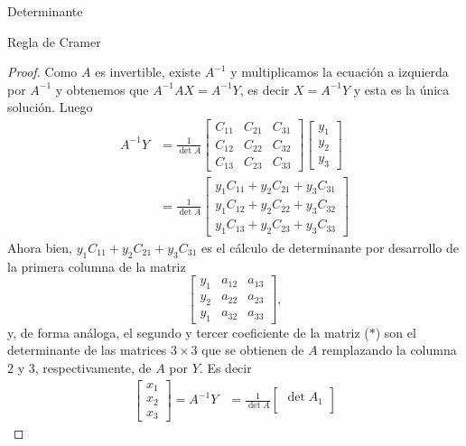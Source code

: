 \begin{chapter}{Determinante}
\begin{section}{Regla de Cramer}
\begin{proof}
                     Como $A$  es invertible, existe $A^{-1}$ y multiplicamos la ecuación a izquierda por $A^{-1}$ y obtenemos que $A^{-1}A X = A^{-1}Y$,  es decir $X = A^{-1}Y$ y esta es la única solución. Luego
                     \begin{align*}
                     A^{-1}Y & = \frac{1}{\det A}
                     \begin{bmatrix} C_{11} & C_{21} & C_{31}\\
                     C_{12} & C_{22} &  C_{32} \\
                     C_{13} & C_{23} & C_{33}\end{bmatrix}
                     \begin{bmatrix} y_1 \\ y_2 \\ y_3 \end{bmatrix} \\
                     &= \frac{1}{\det A}\begin{bmatrix} y_1C_{11}+  y_2C_{21} + y_3C_{31}\\
                     y_1C_{12}+  y_2C_{22}+   y_3C_{32} \\
                     y_1C_{13}+  y_2C_{23}+  y_3C_{33}\end{bmatrix} \tag{$*$}
                     \end{align*}
                     Ahora bien,  $y_1C_{11}+  y_2C_{21}+   y_3C_{31}$ es el cálculo de determinante por desarrollo de la primera columna de la matriz 
                     $$
                     \begin{bmatrix}
                     y_1 & a_{12} & a_{13} \\y_2 & a_{22} & a_{23} \\y_1 & a_{32} & a_{33} 
                     \end{bmatrix},
                     $$
                     y,  de forma análoga, el segundo y tercer coeficiente de la matriz ($*$) son el determinante de las matrices $3 \times 3$ que se obtienen de $A$ remplazando la columna $2$ y $3$, respectivamente, de
                     $A$ por $Y$. Es decir
                     \begin{align*}
                     \begin{bmatrix} x_1\\
                     x_2 \\
                     x_3\end{bmatrix} = A^{-1}Y & = \frac{1}{\det A}\begin{bmatrix} \det A_1\\

\end{bmatrix}
\end{align*}
\end{proof}
\end{section}
\end{chapter}

